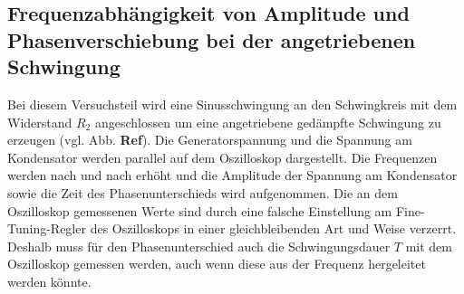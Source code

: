 \subsection{Frequenzabhängigkeit von Amplitude und Phasenverschiebung bei der angetriebenen Schwingung}
Bei diesem Versuchsteil wird eine Sinusschwingung an den Schwingkreis mit dem
Widerstand $R_2$ angeschlossen um eine angetriebene gedämpfte Schwingung zu erzeugen (vgl. Abb. \textbf{Ref}).
Die Generatorspannung und die Spannung am Kondensator werden parallel auf dem Oszilloskop dargestellt.
Die Frequenzen werden nach und nach erhöht und die Amplitude der Spannung am Kondensator
sowie die Zeit des Phasenunterschieds wird aufgenommen.
Die an dem Oszilloskop gemessenen Werte sind durch eine falsche Einstellung am Fine-Tuning-Regler des Oszilloskops
in einer gleichbleibenden Art und Weise verzerrt.
Deshalb muss für den Phasenunterschied auch die Schwingungsdauer $T$ mit dem Oszilloskop gemessen werden, 
auch wenn diese aus der Frequenz hergeleitet werden könnte.
